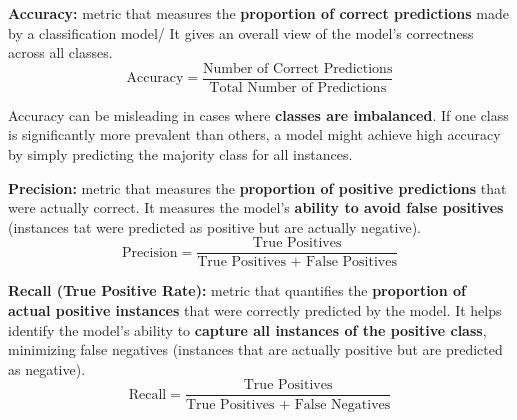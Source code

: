 \begin{enumerate}
\begin{definition}
    \textbf{Accuracy:} metric that measures the \textbf{proportion of correct predictions} made by a classification model/ It gives an overall view of the model's correctness across all classes.\\
\[ \text{Accuracy} = \frac{\text{Number of Correct Predictions}}{\text{Total Number of Predictions}} \]
\end{definition}

\begin{warning}
Accuracy can be misleading in cases where \textbf{classes are imbalanced}. If one class is significantly more prevalent than others, a model might achieve high accuracy by simply predicting the majority class for all instances.
\end{warning}

\begin{definition}
    \textbf{Precision:} metric that measures the \textbf{proportion of positive predictions} that were actually correct. It measures the model's \textbf{ability to avoid false positives} (instances tat were predicted as positive but are actually negative).\\
\[\text{Precision} = \frac{\text{True Positives}}{\text{True Positives + False Positives}} \] 
\end{definition}

\begin{definition}
    \textbf{Recall (True Positive Rate):} metric that quantifies the \textbf{proportion of actual positive instances} that were correctly predicted by the model. It helps identify the model's ability to \textbf{capture all instances of the positive class}, minimizing false negatives (instances that are actually positive but are predicted as negative). \\
\[ \text{Recall} = \frac{\text{True Positives}}{\text{True Positives + False Negatives}}\]
\end{definition}




\end{enumerate}
